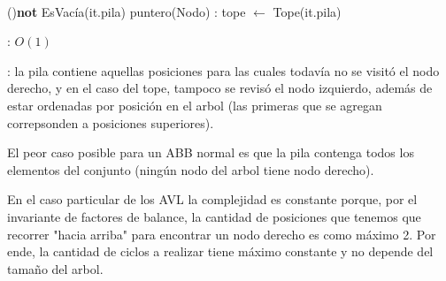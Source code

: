 \begin{Algoritmos}
	~

	\begin{algorithm}[H]
		\NoCaptionOfAlgo
		\caption{}
		\While(){\textbf{not} EsVacía(it.pila)} {
			puntero(Nodo) : tope $\leftarrow$ Tope(it.pila)
		}
	\end{algorithm}

	\complejidad: $O(1)$

	\justifcomp: la pila contiene aquellas posiciones para las cuales todavía no se visitó el nodo derecho, y en el caso del tope, tampoco se revisó el nodo izquierdo, además de estar ordenadas por posición en el arbol (las primeras que se agregan correpsonden a posiciones superiores).

	El peor caso posible para un ABB normal es que la pila contenga todos los elementos del conjunto (ningún nodo del arbol tiene nodo derecho).

	En el caso particular de los AVL la complejidad es constante porque, por el invariante de factores de balance, la cantidad de posiciones que tenemos que recorrer "hacia arriba" para encontrar un nodo derecho es como máximo 2. Por ende, la cantidad de ciclos a realizar tiene máximo constante y no depende del tamaño del arbol.

\end{Algoritmos}